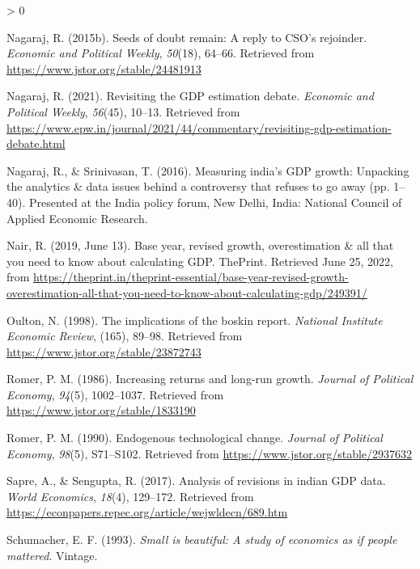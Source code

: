 \documentclass[12pt,nobind, a4paper]{reedthesis}
\newlength{\cslhangindent}
\newenvironment{CSLReferences}[2] %
{%
	\setlength{\parindent}{0pt}
	\ifodd #1 \everypar{\setlength{\hangindent}{\cslhangindent}}\ignorespaces\fi
	\ifnum #2 > 0
	\setlength{\parskip}{#2\baselineskip}
	\fi
}%
{}
\begin{document}
\begin{CSLReferences}{1}{0}
 \leavevmode\hypertarget{ref-nagaraj_seeds_2015}{}%
 Nagaraj, R. (2015b). Seeds of doubt remain: A reply to {CSO}'s rejoinder. \emph{Economic and Political Weekly}, \emph{50}(18), 64--66. Retrieved from \url{https://www.jstor.org/stable/24481913}

 \leavevmode\hypertarget{ref-nagaraj_revisiting_2021}{}%
 Nagaraj, R. (2021). Revisiting the {GDP} estimation debate. \emph{Economic and Political Weekly}, \emph{56}(45), 10--13. Retrieved from \url{https://www.epw.in/journal/2021/44/commentary/revisiting-gdp-estimation-debate.html}

 \leavevmode\hypertarget{ref-nagaraj_measuring_2016}{}%
 Nagaraj, R., \& Srinivasan, T. (2016). Measuring india's {GDP} growth: Unpacking the analytics \& data issues behind a controversy that refuses to go away (pp. 1--40). Presented at the India policy forum, New Delhi, India: National Council of Applied Economic Research.

 \leavevmode\hypertarget{ref-nair_base_2019}{}%
 Nair, R. (2019, June 13). Base year, revised growth, overestimation \& all that you need to know about calculating {GDP}. {ThePrint}. Retrieved June 25, 2022, from \url{https://theprint.in/theprint-essential/base-year-revised-growth-overestimation-all-that-you-need-to-know-about-calculating-gdp/249391/}

 \leavevmode\hypertarget{ref-oulton_implications_1998}{}%
 Oulton, N. (1998). The implications of the boskin report. \emph{National Institute Economic Review}, (165), 89--98. Retrieved from \url{https://www.jstor.org/stable/23872743}

 \leavevmode\hypertarget{ref-romer_increasing_1986}{}%
 Romer, P. M. (1986). Increasing returns and long-run growth. \emph{Journal of Political Economy}, \emph{94}(5), 1002--1037. Retrieved from \url{https://www.jstor.org/stable/1833190}

 \leavevmode\hypertarget{ref-romer_endogenous_1990}{}%
 Romer, P. M. (1990). Endogenous technological change. \emph{Journal of Political Economy}, \emph{98}(5), S71--S102. Retrieved from \url{https://www.jstor.org/stable/2937632}

 \leavevmode\hypertarget{ref-sapre_analysis_2017}{}%
 Sapre, A., \& Sengupta, R. (2017). Analysis of revisions in indian {GDP} data. \emph{World Economics}, \emph{18}(4), 129--172. Retrieved from \url{https://econpapers.repec.org/article/wejwldecn/689.htm}

 \leavevmode\hypertarget{ref-schumacher_small_1993}{}%
 Schumacher, E. F. (1993). \emph{Small is beautiful: A study of economics as if people mattered}. Vintage.


\end{CSLReferences}
\end{document}
